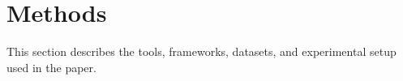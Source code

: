 \section{Methods}

This section describes the tools, frameworks, datasets, and experimental setup used in the paper.